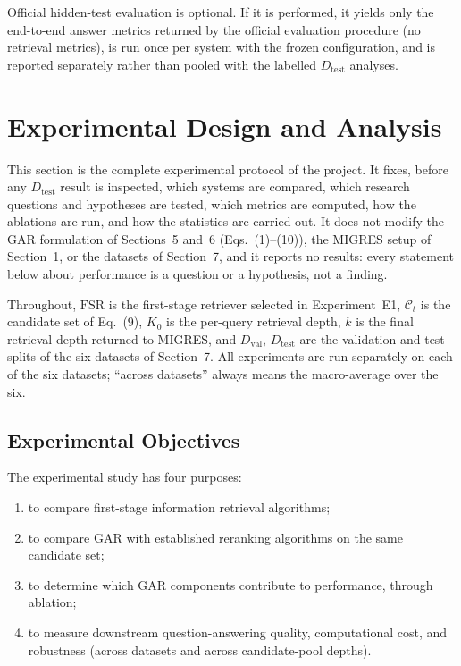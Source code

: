 \documentclass[11pt,a4paper]{article}
\begin{document}
Official hidden-test evaluation is optional. If it is performed, it yields only the end-to-end answer metrics returned by the official evaluation procedure (no retrieval metrics), is run once per system with the frozen configuration, and is reported separately rather than pooled with the labelled $D_{\mathrm{test}}$ analyses.

\section{Experimental Design and Analysis}
\label{sec:expdesign}

This section is the complete experimental protocol of the project. It fixes, before any $D_{\mathrm{test}}$ result is inspected, which systems are compared, which research questions and hypotheses are tested, which metrics are computed, how the ablations are run, and how the statistics are carried out. It does not modify the GAR formulation of Sections~5 and~6 (Eqs.~(1)--(10)), the MIGRES setup of Section~1, or the datasets of Section~7, and it reports no results: every statement below about performance is a question or a hypothesis, not a finding.

Throughout, $\mathrm{FSR}$ is the first-stage retriever selected in Experiment~E1, $\mathcal{C}_t$ is the candidate set of Eq.~(9), $K_0$ is the per-query retrieval depth, $k$ is the final retrieval depth returned to MIGRES, and $D_{\mathrm{val}}$, $D_{\mathrm{test}}$ are the validation and test splits of the six datasets of Section~7. All experiments are run separately on each of the six datasets; ``across datasets'' always means the macro-average over the six.

\subsection{Experimental Objectives}
\label{sec:obj}

The experimental study has four purposes:

\begin{enumerate}[leftmargin=1.5em]
\item to compare first-stage information retrieval algorithms;
\item to compare GAR with established reranking algorithms on the same candidate set;
\item to determine which GAR components contribute to performance, through ablation;
\item to measure downstream question-answering quality, computational cost, and robustness (across datasets and across candidate-pool depths).
\end{enumerate}
\end{document}

